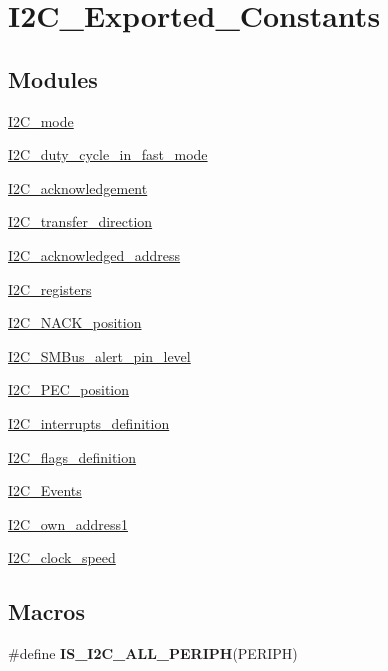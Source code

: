 \hypertarget{group___i2_c___exported___constants}{\section{I2\-C\-\_\-\-Exported\-\_\-\-Constants}
\label{group___i2_c___exported___constants}
}
\subsection*{Modules}
\begin{DoxyCompactItemize}
\item 
\hyperlink{group___i2_c__mode}{I2\-C\-\_\-mode}
\item 
\hyperlink{group___i2_c__duty__cycle__in__fast__mode}{I2\-C\-\_\-duty\-\_\-cycle\-\_\-in\-\_\-fast\-\_\-mode}
\item 
\hyperlink{group___i2_c__acknowledgement}{I2\-C\-\_\-acknowledgement}
\item 
\hyperlink{group___i2_c__transfer__direction}{I2\-C\-\_\-transfer\-\_\-direction}
\item 
\hyperlink{group___i2_c__acknowledged__address}{I2\-C\-\_\-acknowledged\-\_\-address}
\item 
\hyperlink{group___i2_c__registers}{I2\-C\-\_\-registers}
\item 
\hyperlink{group___i2_c___n_a_c_k__position}{I2\-C\-\_\-\-N\-A\-C\-K\-\_\-position}
\item 
\hyperlink{group___i2_c___s_m_bus__alert__pin__level}{I2\-C\-\_\-\-S\-M\-Bus\-\_\-alert\-\_\-pin\-\_\-level}
\item 
\hyperlink{group___i2_c___p_e_c__position}{I2\-C\-\_\-\-P\-E\-C\-\_\-position}
\item 
\hyperlink{group___i2_c__interrupts__definition}{I2\-C\-\_\-interrupts\-\_\-definition}
\item 
\hyperlink{group___i2_c__flags__definition}{I2\-C\-\_\-flags\-\_\-definition}
\item 
\hyperlink{group___i2_c___events}{I2\-C\-\_\-\-Events}
\item 
\hyperlink{group___i2_c__own__address1}{I2\-C\-\_\-own\-\_\-address1}
\item 
\hyperlink{group___i2_c__clock__speed}{I2\-C\-\_\-clock\-\_\-speed}
\end{DoxyCompactItemize}
\subsection*{Macros}
\begin{DoxyCompactItemize}
\item 
\#define {\bfseries I\-S\-\_\-\-I2\-C\-\_\-\-A\-L\-L\-\_\-\-P\-E\-R\-I\-P\-H}(P\-E\-R\-I\-P\-H)
\end{DoxyCompactItemize}


